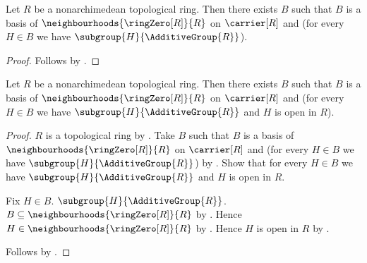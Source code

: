 \begin{proposition}\label{nonarchimedean_topological_ring_has_subgroup_basis}
    Let $R$ be a nonarchimedean topological ring.
    Then there exists $B$ such that
        $B$ is a basis of
            $\neighbourhoods{\ringZero[R]}{R}$ on $\carrier[R]$ and
        (for every $H\in B$ we have
            $\subgroup{H}{\AdditiveGroup{R}}$).
\end{proposition}
\begin{proof}
    Follows by .
\end{proof}

\begin{theorem}\label{nonarchimedean_topological_ring_has_open_subgroup_basis}
    Let $R$ be a nonarchimedean topological ring.
    Then there exists $B$ such that
        $B$ is a basis of
            $\neighbourhoods{\ringZero[R]}{R}$ on $\carrier[R]$ and
        (for every $H\in B$ we have
            $\subgroup{H}{\AdditiveGroup{R}}$ and $H$ is open in $R$).
\end{theorem}
\begin{proof}
    $R$ is a topological ring by
        .
    Take $B$ such that $B$ is a basis of
        $\neighbourhoods{\ringZero[R]}{R}$ on $\carrier[R]$ and
        (for every $H\in B$ we have
            $\subgroup{H}{\AdditiveGroup{R}}$) by
        .
    Show that for every $H\in B$ we have
        $\subgroup{H}{\AdditiveGroup{R}}$ and $H$ is open in $R$.
    \begin{subproof}
        Fix $H\in B$.
        $\subgroup{H}{\AdditiveGroup{R}}$.
        $B\subseteq\neighbourhoods{\ringZero[R]}{R}$ by
            .
        Hence $H\in\neighbourhoods{\ringZero[R]}{R}$ by .
        Hence $H$ is open in $R$ by
            .
    \end{subproof}
    Follows by \auto.
\end{proof}

